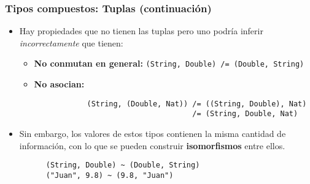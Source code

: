 \documentclass{beamer}
\begin{document}
\begin{frame}[fragile]
  \frametitle{Tipos compuestos: Tuplas (continuación)}

  \begin{itemize}
    \item Hay propiedades que no tienen las tuplas pero uno podría inferir
      \emph{incorrectamente} que tienen:
      \begin{itemize}
        \item \textbf{No conmutan en general:}
          \texttt{(String, Double) /= (Double, String) }
        \item \textbf{No asocian:}
          \begin{verbatim}
            (String, (Double, Nat)) /= ((String, Double), Nat)
                                    /= (String, Double, Nat)
          \end{verbatim}
      \end{itemize}
    \item Sin embargo, los valores de estos tipos contienen la misma cantidad de
      información, con lo que se pueden construir \textbf{isomorfismos} entre ellos.
      \vspace{4pt}
      \begin{verbatim}
      (String, Double) ~ (Double, String)
      ("Juan", 9.8) ~ (9.8, "Juan")
      \end{verbatim}
  \end{itemize}

\end{frame}
\end{document}
